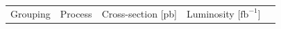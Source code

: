 \begin{table}[ht]
{    %
      \begin{tabular}{c|cccccc}
        \toprule
        Grouping &
        Process &
        Cross-section [pb] &
        \multicolumn{3}{c}{Luminosity [$\mathrm{fb}^{-1}$]} &

\end{tabular}}
\end{table}
